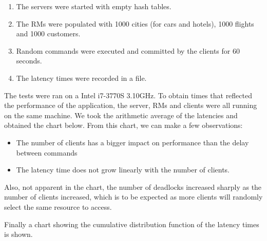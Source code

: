 \documentclass[10pt]{article}
\begin{document}
\begin{enumerate}
\item The servers were started with empty hash tables.
\item The RMs were populated with 1000 cities (for cars
  and hotels), 1000 flights and 1000 customers.
\item Random commands were executed and committed by the clients for
  60 seconds.
\item The latency times were recorded in a file.
\end{enumerate}

The tests were ran on a Intel i7-3770S 3.10GHz.  To obtain times that
reflected the performance of the application, the server, RMs and
clients were all running on the same machine.  We took the arithmetic
average of the latencies and obtained the chart below.  From this
chart, we can make a few observations:

\begin{itemize}
\item The number of clients has a bigger impact on performance than
  the delay between commands
\item The latency time does not grow linearly with the number of
  clients.
\end{itemize}

Also, not apparent in the chart, the number of deadlocks increased
sharply as the number of clients increased, which is to be expected as
more clients will randomly select the same resource to access.

Finally a chart showing the cumulative distribution function of the
latency times is shown.
\end{document}

